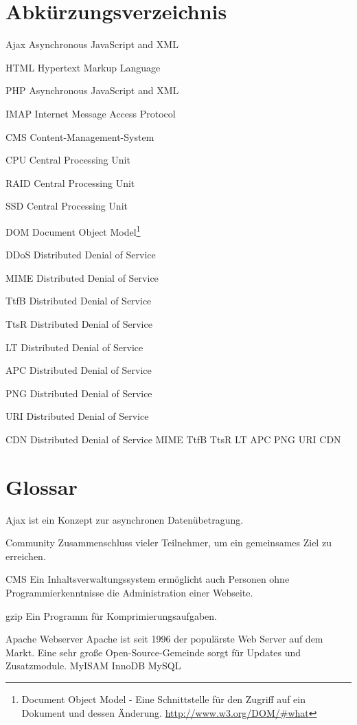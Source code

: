 \section*{Abk\"urzungsverzeichnis}
\begin{basedescript}{\desclabelstyle{\pushlabel}\desclabelwidth{6em}}
  \item[Ajax] Asynchronous JavaScript and XML
  \item[HTML] Hypertext Markup Language
  \item[PHP] Asynchronous JavaScript and XML
  \item[IMAP] Internet Message Access Protocol
  \item[CMS] Content-Management-System
  \item[CPU] Central Processing Unit
  \item[RAID] Central Processing Unit
  \item[SSD] Central Processing Unit
  \item[DOM] Document Object Model\footnote{Document Object Model - Eine Schnittstelle f\"ur den Zugriff auf ein Dokument und dessen \"Anderung. \url{http://www.w3.org/DOM/\#what}}
  \item[DDoS] Distributed Denial of Service
  \item[MIME] Distributed Denial of Service
  \item[TtfB] Distributed Denial of Service
  \item[TtsR] Distributed Denial of Service
  \item[LT] Distributed Denial of Service
  \item[APC] Distributed Denial of Service
  \item[PNG] Distributed Denial of Service
  \item[URI] Distributed Denial of Service
  \item[CDN] Distributed Denial of Service
MIME
TtfB
TtsR
LT
APC
PNG
URI
CDN
\end{basedescript}
\section*{Glossar}
\begin{basedescript}{\desclabelstyle{\pushlabel}\desclabelwidth{6em}}
  \item[Ajax] ist ein Konzept zur asynchronen Daten\"ubetragung.
  \item[Community] Zusammenschluss vieler Teilnehmer, um ein gemeinsames Ziel zu erreichen.
  \item[CMS] Ein Inhaltsverwaltungssystem erm\"oglicht auch Personen ohne Programmierkenntnisse die Administration einer Webseite.
  \item[gzip] Ein Programm f\"ur Komprimierungsaufgaben.
  \item[Apache Webserver] Apache ist seit 1996 der popul\"arste Web Server auf dem Markt. Eine sehr gro\ss{}e Open-Source-Gemeinde sorgt f\"ur Updates und Zusatzmodule.
MyISAM
InnoDB
MySQL
\end{basedescript}
